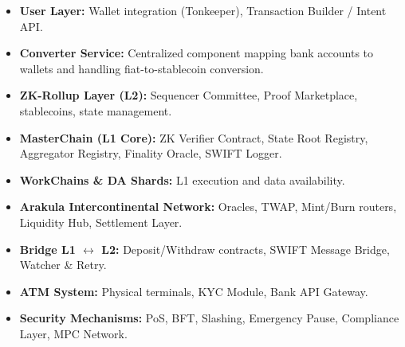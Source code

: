 \documentclass[12pt,a4paper]{article}
\theoremstyle{definition}
\theoremstyle{remark}
\begin{document}
\begin{itemize}[nosep]
    \item \textbf{User Layer:} Wallet integration (Tonkeeper), Transaction Builder / Intent API.
    \item \textbf{Converter Service:} Centralized component mapping bank accounts to wallets and handling fiat-to-stablecoin conversion.
    \item \textbf{ZK-Rollup Layer (L2):} Sequencer Committee, Proof Marketplace, stablecoins, state management.
    \item \textbf{MasterChain (L1 Core):} ZK Verifier Contract, State Root Registry, Aggregator Registry, Finality Oracle, SWIFT Logger.
    \item \textbf{WorkChains \& DA Shards:} L1 execution and data availability.
    \item \textbf{Arakula Intercontinental Network:} Oracles, TWAP, Mint/Burn routers, Liquidity Hub, Settlement Layer.
    \item \textbf{Bridge L1 $\leftrightarrow$ L2:} Deposit/Withdraw contracts, SWIFT Message Bridge, Watcher \& Retry.
    \item \textbf{ATM System:} Physical terminals, KYC Module, Bank API Gateway.
    \item \textbf{Security Mechanisms:} PoS, BFT, Slashing, Emergency Pause, Compliance Layer, MPC Network.
\end{itemize}
\end{document}
